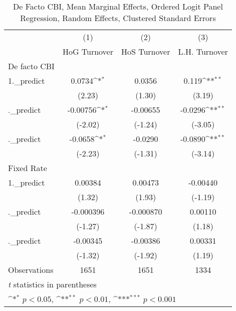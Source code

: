 \begin{table}[htbp]\centering
\def\sym#1{\ifmmode^{#1}\else\(^{#1}\)\fi}
\caption{De Facto CBI, Mean Marginal Effects, Ordered Logit Panel Regression, Random Effects, Clustered Standard Errors \label{ordLogDF}}
\begin{tabular}{l*{3}{c}}
\toprule
                                        &\multicolumn{1}{c}{(1)}&\multicolumn{1}{c}{(2)}&\multicolumn{1}{c}{(3)}\\
                                        &\multicolumn{1}{c}{HoG Turnover}&\multicolumn{1}{c}{HoS Turnover}&\multicolumn{1}{c}{L.H. Turnover}\\
\midrule
De facto CBI                            &                  &                  &                  \\
1.\_predict                              &   0.0734\sym{*}  &   0.0356         &    0.119\sym{**} \\
                                        &   (2.23)         &   (1.30)         &   (3.19)         \\
\addlinespace
2.\_predict                              & -0.00756\sym{*}  & -0.00655         &  -0.0296\sym{**} \\
                                        &  (-2.02)         &  (-1.24)         &  (-3.05)         \\
\addlinespace
3.\_predict                              &  -0.0658\sym{*}  &  -0.0290         &  -0.0890\sym{**} \\
                                        &  (-2.23)         &  (-1.31)         &  (-3.14)         \\
\midrule
Fixed Rate                              &                  &                  &                  \\
1.\_predict                              &  0.00384         &  0.00473         & -0.00440         \\
                                        &   (1.32)         &   (1.93)         &  (-1.19)         \\
\addlinespace
2.\_predict                              &-0.000396         &-0.000870         &  0.00110         \\
                                        &  (-1.27)         &  (-1.87)         &   (1.18)         \\
\addlinespace
3.\_predict                              & -0.00345         & -0.00386         &  0.00331         \\
                                        &  (-1.32)         &  (-1.92)         &   (1.19)         \\
\midrule
Observations                            &     1651         &     1651         &     1334         \\
\bottomrule
\multicolumn{4}{l}{\footnotesize \textit{t} statistics in parentheses}\\
\multicolumn{4}{l}{\footnotesize \sym{*} \(p<0.05\), \sym{**} \(p<0.01\), \sym{***} \(p<0.001\)}\\
\end{tabular}
\end{table}

